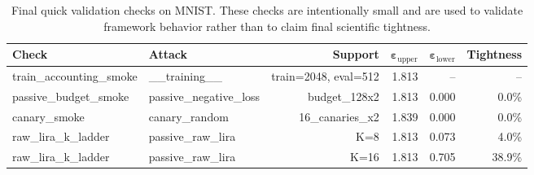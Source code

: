 \begin{table}[h]
\caption{Final quick validation checks on MNIST. These checks are intentionally small and are used to validate framework behavior rather than to claim final scientific tightness.}
\label{tab:final_quick_checks}
\centering
\begin{tabular}{@{}llrrrr@{}}
\toprule
\textbf{Check} & \textbf{Attack} & \textbf{Support} & $\boldsymbol{\varepsilon_{\mathrm{upper}}}$ & $\boldsymbol{\varepsilon_{\mathrm{lower}}}$ & \textbf{Tightness} \\
\midrule
train\_accounting\_smoke & \_\_training\_\_ & train=2048, eval=512 & 1.813 & -- & -- \\
passive\_budget\_smoke & passive\_negative\_loss & budget\_128x2 & 1.813 & 0.000 & 0.0\% \\
canary\_smoke & canary\_random & 16\_canaries\_x2 & 1.839 & 0.000 & 0.0\% \\
raw\_lira\_k\_ladder & passive\_raw\_lira & K=8 & 1.813 & 0.073 & 4.0\% \\
raw\_lira\_k\_ladder & passive\_raw\_lira & K=16 & 1.813 & 0.705 & 38.9\% \\
\bottomrule
\end{tabular}
\end{table}
